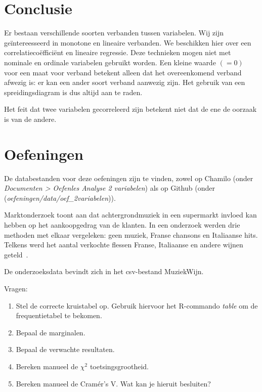 \section{Conclusie}
Er bestaan verschillende soorten verbanden tussen variabelen. Wij zijn ge\"intereesseerd in monotone en lineaire verbanden. We beschikken hier over een correlatieco\"effici\"ent en lineaire regressie. Deze technieken mogen niet met nominale en ordinale variabelen gebruikt worden. Een kleine waarde $(=0)$ voor een maat voor verband betekent alleen dat het overeenkomend verband afwezig is: er kan een ander soort verband aanwezig zijn. Het gebruik van een spreidingsdiagram is dus altijd aan te raden.

Het feit dat twee variabelen gecorreleerd zijn betekent niet dat de ene de oorzaak is van de andere.

\section{Oefeningen}
\label{sec:analyse op 2 variabelen-oefeningen}

De databestanden voor deze oefeningen zijn te vinden, zowel op Chamilo (onder \emph{Documenten > Oefenles Analyse 2 variabelen}) als op Github (onder (\emph{oefeningen/data/oef\_2variabelen})).

\begin{exercise}
  \label{oef:Kruistabellen, Cramér's V en chi-kwadraat - handmatig} %

  Marktonderzoek toont aan dat achtergrondmuziek in een supermarkt invloed kan hebben op het aankoopgedrag van de klanten. In een onderzoek werden drie methoden met elkaar vergeleken: geen muziek, Franse chansons en Italiaanse hits. Telkens werd het aantal verkochte flessen Franse, Italiaanse en andere wijnen geteld~\autocite{Ryan1998}.
  
  De onderzoeksdata bevindt zich in het csv-bestand MuziekWijn.

  Vragen:
  \begin{enumerate}
    \item Stel de correcte kruistabel op. Gebruik hiervoor het R-commando \textit{table} om de frequentietabel te bekomen.
    \item Bepaal de marginalen.
    \item Bepaal de verwachte resultaten.
    \item Bereken manueel de $\chi^{2}$ toetsingsgrootheid.  
    \item Bereken manueel de Cramér's V. Wat kan je hieruit besluiten?
  \end{enumerate}
\end{exercise}

